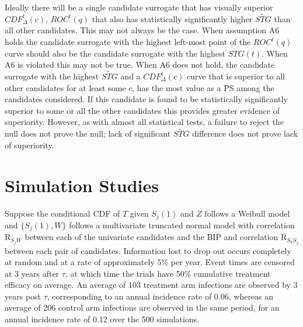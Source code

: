 \documentclass[times, doublespace]{simauth}
\begin{document}
Ideally there will be a single candidate surrogate that has visually superior $CDF^{t}_{\Delta}(c)$, $ROC^{t}(q)$ that also has statistically significantly higher $\widetilde{STG}$ than all other candidates. This may not always be the case. When assumption A6 holds the candidate surrogate with the highest left-most point of the $ROC^{t}(q)$ curve should also be the candidate surrogate with the highest $STG(t)$. When A6 is violated this may not be true. When A6 does not hold, the candidate surrogate with the highest $\widetilde{STG}$ and a $CDF^{t}_{\Delta}(c)$ curve that is superior to all other candidates for at least some $c$, has the most value as a PS among the candidates considered. If this candidate is found to be statistically significantly superior to some or all the other candidates this provides greater evidence of superiority. However, as with almost all statistical tests, a failure to reject the null does not prove the null; lack of significant  $\widetilde{STG}$ difference does not prove lack of superiority.

\section{Simulation Studies}
Suppose the conditional CDF of $T$ given $S_j(1)$ and $Z$ follows a Weibull model and $\{S_j(1),W\}$ follows a multivariate truncated normal model with correlation R$_{S_jW}$ between each of the univariate candidates and the BIP and correlation R$_{S_kS_j}$ between each pair of candidates. Information lost to drop out occurs completely at random and at a rate of approximately 5\% per year. Event times are censored at 3 years after $\tau$, at which time the trials have 50\% cumulative treatment efficacy on average. An average of 103 treatment arm infections are observed by 3 years post $\tau$, corresponding to an annual incidence rate of 0.06, whereas an average of 206 control arm infections are observed in the same period, for an annual incidence rate of 0.12 over the 500 simulations. 
\end{document}
